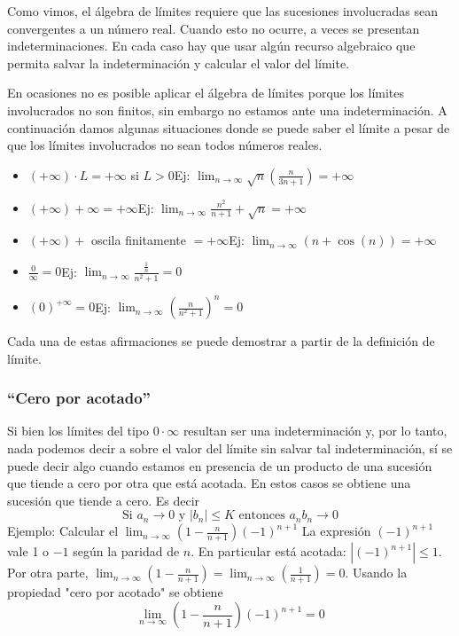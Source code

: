 \documentclass[../Teoría.root.tex]{subfiles}
\begin{document}
Como vimos, el álgebra de límites requiere que las sucesiones involucradas sean convergentes a un número real.
Cuando esto no ocurre, a veces se presentan indeterminaciones.
En cada caso hay que usar algún recurso algebraico que permita salvar la indeterminación y calcular el valor del límite.

En ocasiones no es posible aplicar el álgebra de límites porque los límites involucrados no son finitos, sin embargo no estamos ante una indeterminación.
A continuación damos algunas situaciones donde se puede saber el límite a pesar de que los límites involucrados no sean todos números reales.
\begin{itemize}
    \item \((+\infty)\cdot L=+\infty\) si \(L>0\)\tab Ej:
          \(\lim_{n\to\infty}\sqrt{n}\left(\frac{n}{3n+1}\right)=+\infty\)
    \item \((+\infty)+\infty=+\infty\)\tab Ej:
          \(\lim_{n\to\infty}\frac{n^2}{n+1}+\sqrt{n}=+\infty\)
    \item \((+\infty)+\) oscila finitamente \(=+\infty\)\tab Ej:
          \(\lim_{n\to\infty}(n+\cos(n))=+\infty\)
    \item \(\frac{0}{\infty}=0\)\tab Ej:
          \(\lim_{n\to\infty}\frac{\frac{1}{n}}{n^2+1}=0\)
    \item \((0)^{+\infty}=0\)\tab Ej:
          \(\lim_{n\to\infty}\left(\frac{n}{n^2+1}\right)^n=0\)
\end{itemize}
Cada una de estas afirmaciones se puede demostrar a partir de la definición de límite.
\subsubsection{``Cero por acotado''}
Si bien los límites del tipo \(0\cdot\infty\) resultan ser una indeterminación y, por lo tanto, nada podemos decir a sobre el valor del límite sin salvar tal indeterminación, sí se puede decir algo cuando estamos en presencia de un producto de una sucesión que tiende a cero por otra que está acotada.
En estos casos se obtiene una sucesión que tiende a cero.
Es decir \[\text{Si }a_n\rightarrow0\text{ y }|b_n|\leq K\text{ entonces }a_nb_n\rightarrow0\]
Ejemplo: Calcular el \(\lim_{n\to\infty}\left(1-\frac{n}{n+1}\right)(-1)^{n+1}\)
La expresión \((-1)^{n+1}\) vale 1 o \(-1\) según la paridad de \(n\).
En particular está acotada: \(|(-1)^{n+1}|\leq1\).
Por otra parte, \(\lim_{n\to\infty}\left(1-\frac{n}{n+1}\right)=\lim_{n\to\infty}\left(\frac{1}{n+1}\right)=0\).
Usando la propiedad "cero por acotado" se obtiene
\[\lim_{n\to\infty}\left(1-\frac{n}{n+1}\right)(-1)^{n+1}=0\]
\end{document}
